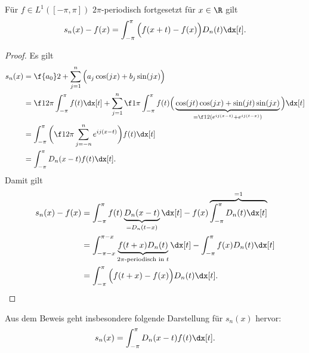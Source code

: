 \begin{lem} \label{3.26}
	Für $f \in L^1([-\pi, \pi])$ $2\pi$-periodisch fortgesetzt für $x\in \R$ gilt
	\begin{align*}
		s_n(x) - f(x) = \int_{-\pi}^{\pi} \Big(f(x+t) - f(x)\Big) D_n(t) \dx[t].
	\end{align*}
	\begin{proof}
		Es gilt
		\begin{align*}
			s_n(x)
			&= \f {a_0}2 + \sum_{j=1}^n \Big( a_j \cos(jx) + b_j \sin(jx) \Big) \\
			&= \f 1{2 \pi} \int_{-\pi}^{\pi} f(t) \dx[t] + \sum_{j=1}^n \f 1{\pi} \int_{-\pi}^{\pi} f(t) \Big( \underbrace{\cos(jt) \cos(jx) + \sin(jt) \sin(jx)}_{= \f 12 ( e^{ij(x-t)} + e^{ij(t-x)})} \Big) \dx[t] \\
			&= \int_{-\pi}^{\pi} \bigg( \f 1{2\pi} \sum_{j=-n}^n e^{ij(x-t)} \bigg) f(t) \dx[t] \\
			&= \int_{-\pi}^{\pi} D_n(x-t) f(t) \dx[t].
		\end{align*}
		Damit gilt
		\begin{align*}
			s_n(x) - f(x)
			&= \int_{-\pi}^{\pi} f(t) \underbrace{D_n(x-t)}_{=D_n(t-x)} \dx[t] - f(x) \overbrace{\int_{-\pi}^{\pi} D_n(t) \dx[t]}^{=1} \\
			&= \int_{-\pi-x}^{\pi-x} \underbrace{f(t + x)D_n(t)}_{\text{$2\pi$-periodisch in $t$}} \dx[t] - \int_{-\pi}^\pi f(x) D_n(t) \dx[t] \\
			&= \int_{-\pi}^{\pi} \Big( f(t + x) - f(x) \Big) D_n(t) \dx[t].
		\end{align*}
	\end{proof}
	\begin{note}
		Aus dem Beweis geht insbesondere folgende Darstellung für $s_n(x)$ hervor:
		\begin{align*}
			s_n(x) = \int_{-\pi}^{\pi} D_n(x-t) f(t) \dx[t].
		\end{align*}
	\end{note}
\end{lem}

